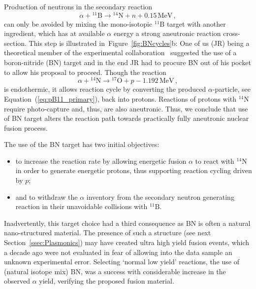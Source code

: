 \documentclass[particles,article,accept,pdftex,moreauthors]{Definitions/mdpi}
\newcommand{\req}[1]{Equation~(\ref{#1})}
\newcommand{\rf}[1]{Figure~\ref{#1}}
\newcommand{\rsec}[1]{Section~\ref{#1}}
\begin{document}
Production of neutrons in the secondary reaction
\begin{equation}
 \alpha+{}^{11}\mathrm{B}\to {}^{14}\mathrm{N}+n+0.15\,\mathrm{MeV}\,,
\end{equation}
can only be avoided by mixing the mono-isotopic ${}^{11}\mathrm{B}$ target with another ingredient, which has at available $\alpha$ energy a strong aneutronic reaction cross-section. This step is illustrated in~\rf{fig:BNcycles}b: One of us (JR) being a theoretical member of the experimental collaboration~\cite{Labaune:2016mqp} suggested the use of a boron-nitride (BN) target and in the end JR had to procure BN out of his pocket to allow his proposal to proceed. Though the reaction 
\begin{equation}\label{eq:aN}
 \alpha+{}^{14}\mathrm{N}\to {}^{17}\mathrm{O}+p-1.192\,\mathrm{MeV}\,,
\end{equation}
is endothermic, it allows reaction cycle by converting the produced $\alpha$-particle, see \req{eq:pB11_primary}, back into protons. Reactions of protons with ${}^{14}\mathrm{N}$ require photo-capture and, thus, are also aneutronic. Thus, we conclude that use of BN target alters the reaction path towards practically fully aneutronic nuclear fusion process.

The use of the BN target has two initial objectives:
\begin{itemize}
 \item[(a)] to increase the reaction rate by allowing energetic fusion $\alpha$ to react with ${}^{14}\mathrm{N}$ in order to generate energetic protons, thus supporting reaction cycling driven by $p$;
 \item[(b)] and to withdraw the $\alpha$ inventory from the secondary neutron generating reaction in their unavoidable collisions with ${}^{11}\mathrm{B}$.
\end{itemize}
Inadvertently, this target choice had a third consequence as BN is often a natural nano-structured material. The presence of such a structure (see next \rsec{ssec:Plasmonics}) may have created ultra high yield fusion events, which a decade ago were not evaluated in fear of allowing into the data sample an unknown experimental error. Selecting `normal low yield' reactions, the use of (natural isotope mix) BN, was a success with considerable increase in the observed $\alpha$ yield, verifying the proposed fusion material.

\end{document}
